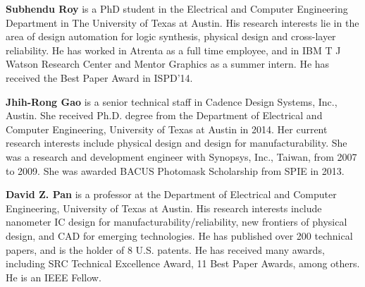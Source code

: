 \documentclass[12pt]{spieman}
\theoremstyle{plain}
\begin{document}
\begin{spacing}{1}
\vspace{2ex}\noindent
{\bf Subhendu Roy}
is a PhD student in the Electrical and Computer Engineering Department in The University of Texas at Austin.
His research interests lie in the area of design automation for logic synthesis, physical design and cross-layer reliability.
He has worked in Atrenta as a full time employee, and in IBM T J Watson Research Center and Mentor Graphics as a summer intern.
He has received the Best Paper Award in ISPD'14.

\vspace{2ex}\noindent
{\bf Jhih-Rong Gao}
is a senior technical staff in Cadence Design Systems, Inc., Austin.
She received Ph.D. degree from the Department of Electrical and Computer Engineering, University of Texas at Austin in 2014.
Her current research interests include physical design and design for manufacturability.
She was a research and development engineer with Synopsys, Inc., Taiwan, from 2007 to 2009. 
She was awarded BACUS Photomask Scholarship from SPIE in 2013.


\vspace{2ex}\noindent
{\bf David Z. Pan}
is a professor at the Department of Electrical and Computer Engineering, University of Texas at Austin.
His research interests include nanometer IC design for manufacturability/reliability, new frontiers of physical design, and CAD for emerging technologies.
He has published over 200 technical papers, and is the holder of 8 U.S. patents.
He has received many awards, including SRC Technical Excellence Award, 11 Best Paper Awards, among others.
He is an IEEE Fellow.
\fi

\end{spacing}
\end{document}
